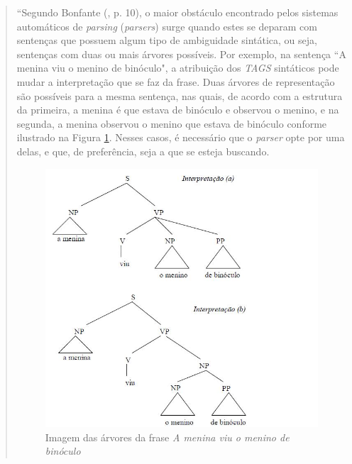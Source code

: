 \begin{quotation}
\footnotesize
``Segundo Bonfante (\cite{bonfante03}, p. 10), o maior obstáculo encontrado pelos sistemas automáticos de \emph{parsing} (\emph{parsers}) surge quando estes se deparam com sentenças que possuem algum tipo de ambiguidade sintática, ou seja, sentenças com duas ou mais árvores possíveis. Por exemplo, na sentença ``A menina viu o menino de binóculo", a atribuição dos \emph{TAGS} sintáticos pode mudar a interpretação que se faz da frase. Duas árvores de representação são possíveis para a mesma sentença, nas quais, de acordo com a estrutura da primeira, a menina é que estava de binóculo e observou o menino, e na segunda, a menina observou o menino que estava de binóculo conforme ilustrado na Figura \ref{ambiguidade}. Nesses casos, é necessário que o \emph{parser} opte por uma delas, e que, de preferência, seja a que se esteja buscando.

\begin{figure}
	\begin{center}
		\includegraphics[scale=0.5]{ambig.jpg}
		\caption{\label{ambiguidade} Imagem das árvores da frase \emph{A menina viu o menino de binóculo}}		
	\end{center}
\end{figure}


\end{quotation}
